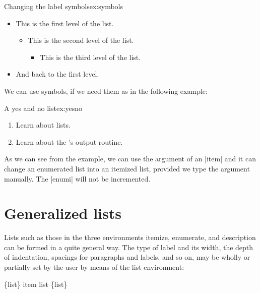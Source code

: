 \begin{texexample}{Changing the label symbols}{ex:symbols}
\renewcommand{\labelitemiii}{\ding{51}}
\begin{itemize}
\item This is the first level of the list.
  \begin{itemize}
     \item This is the second level of the list.
     \begin{itemize}
     \item This is the third level of the list.
     \end{itemize}
  \end{itemize}
\item And back to the first level.
\end{itemize}

\end{texexample}

We can use symbols, if we need them as in the following example:

\begin{texexample}{A yes and no list}{ex:yesno}
\newcommand{\Yess}{\ding{51}}
\newcommand{\Noo}{\ding{55}}

\begin{enumerate}
 \item[\Yess] Learn about lists.
 \item[\Noo] Learn about the \tex's output routine.
\end{enumerate}
\end{texexample}

As we can see from the example, we can use the argument of an |item| and it can change an enumerated list into an itemized list, provided we type the argument manually. The |enumi| will not be incremented. 



\section{Generalized lists}

Lists such as those in the three environments itemize, enumerate, and
description can be formed in a quite general way. The type of label and
its width, the depth of indentation, spacings for paragraphs and labels,
and so on, may be wholly or partially set by the user by means of the list
environment:

\bgroup
\trivlist\item 
     \{list\} item list \{list\}
\endtrivlist
\egroup


